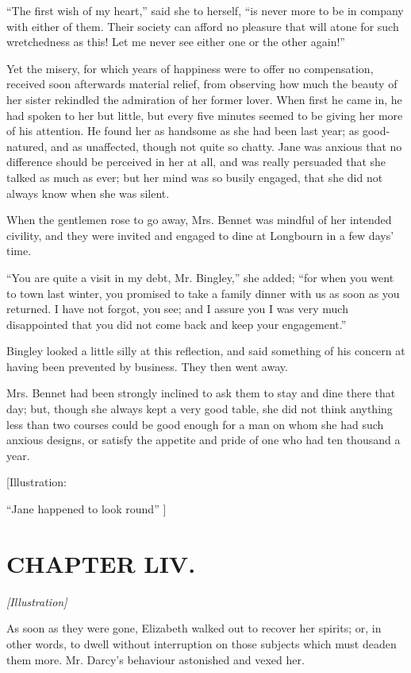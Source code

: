 \documentclass[12pt]{book}
\begin{document}
``The first wish of my heart,'' said she to herself, ``is never more to be in company with either of them. Their society can afford no pleasure that will atone for such wretchedness as this! Let me never see either one or the other again!''

Yet the misery, for which years of happiness were to offer no compensation, received soon afterwards material relief, from observing how much the beauty of her sister rekindled the admiration of her former lover. When first he came in, he had spoken to her but little, but every five minutes seemed to be giving her more of his attention. He found her as handsome as she had been last year; as good-natured, and as unaffected, though not quite so chatty. Jane was anxious that no difference should be perceived in her at all, and was really persuaded that she talked as much as ever; but her mind was so busily engaged, that she did not always know when she was silent.

When the gentlemen rose to go away, Mrs. Bennet was mindful of her intended civility, and they were invited and engaged to dine at Longbourn in a few days' time.

``You are quite a visit in my debt, Mr. Bingley,'' she added; ``for when you went to town last winter, you promised to take a family dinner with us as soon as you returned. I have not forgot, you see; and I assure you I was very much disappointed that you did not come back and keep your engagement.''

Bingley looked a little silly at this reflection, and said something of his concern at having been prevented by business. They then went away.

Mrs. Bennet had been strongly inclined to ask them to stay and dine there that day; but, though she always kept a very good table, she did not think anything less than two courses could be good enough for a man on whom she had such anxious designs, or satisfy the appetite and pride of one who had ten thousand a year.

[Illustration:

``Jane happened to look round'' ]

\chapter{CHAPTER LIV.}

\emph{[Illustration]}

As soon as they were gone, Elizabeth walked out to recover her spirits; or, in other words, to dwell without interruption on those subjects which must deaden them more. Mr. Darcy's behaviour astonished and vexed her.
\end{document}
